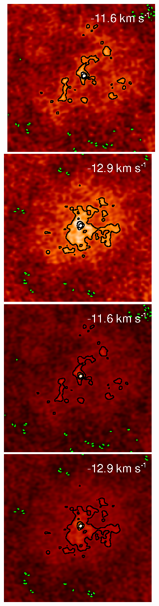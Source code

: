 \documentclass[preprint]{aastex}
\begin{document}
\begin{figure}
{          }
\\
\mbox{
          \includegraphics[]{test36.ps}
          \includegraphics[]{test37.ps}
          \includegraphics[]{test_36.ps}
          \includegraphics[]{test_37.ps}
}
\end{figure}
\end{document}
